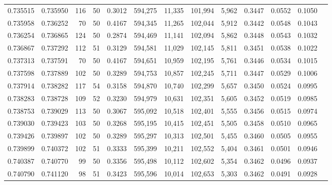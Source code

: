 \begin{tabular}{rrrrrrrrrrrrr}
0.735515 & 0.735950 &   116 &  50 &                                     0.3012 & 594,275 &  11,335 & 101,994 &   5,962 & 0.3447 & 0.0552 & 0.1050 \\
0.735958 & 0.736252 &    70 &  50 &                                     0.4167 & 594,345 &  11,265 & 102,044 &   5,912 & 0.3442 & 0.0548 & 0.1043 \\
0.736254 & 0.736865 &   124 &  50 &                                     0.2874 & 594,469 &  11,141 & 102,094 &   5,862 & 0.3448 & 0.0543 & 0.1032 \\
0.736867 & 0.737292 &   112 &  51 &                                     0.3129 & 594,581 &  11,029 & 102,145 &   5,811 & 0.3451 & 0.0538 & 0.1022 \\
0.737313 & 0.737591 &    70 &  50 &                                     0.4167 & 594,651 &  10,959 & 102,195 &   5,761 & 0.3446 & 0.0534 & 0.1015 \\
0.737598 & 0.737889 &   102 &  50 &                                     0.3289 & 594,753 &  10,857 & 102,245 &   5,711 & 0.3447 & 0.0529 & 0.1006 \\
0.737914 & 0.738282 &   117 &  54 &                                     0.3158 & 594,870 &  10,740 & 102,299 &   5,657 & 0.3450 & 0.0524 & 0.0995 \\
0.738283 & 0.738728 &   109 &  52 &                                     0.3230 & 594,979 &  10,631 & 102,351 &   5,605 & 0.3452 & 0.0519 & 0.0985 \\
0.738753 & 0.739029 &   113 &  50 &                                     0.3067 & 595,092 &  10,518 & 102,401 &   5,555 & 0.3456 & 0.0515 & 0.0974 \\
0.739030 & 0.739423 &   103 &  50 &                                     0.3268 & 595,195 &  10,415 & 102,451 &   5,505 & 0.3458 & 0.0510 & 0.0965 \\
0.739426 & 0.739897 &   102 &  50 &                                     0.3289 & 595,297 &  10,313 & 102,501 &   5,455 & 0.3460 & 0.0505 & 0.0955 \\
0.739899 & 0.740372 &   102 &  51 &                                     0.3333 & 595,399 &  10,211 & 102,552 &   5,404 & 0.3461 & 0.0501 & 0.0946 \\
0.740387 & 0.740770 &    99 &  50 &                                     0.3356 & 595,498 &  10,112 & 102,602 &   5,354 & 0.3462 & 0.0496 & 0.0937 \\
0.740790 & 0.741120 &    98 &  51 &                                     0.3423 & 595,596 &  10,014 & 102,653 &   5,303 & 0.3462 & 0.0491 & 0.0928 \\

\end{tabular}
